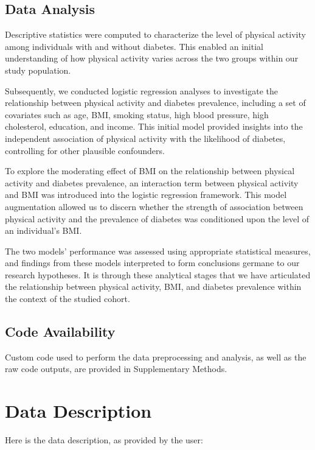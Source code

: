 \documentclass[11pt]{article}
\begin{document}
\subsection*{Data Analysis}
Descriptive statistics were computed to characterize the level of physical activity among individuals with and without diabetes. This enabled an initial understanding of how physical activity varies across the two groups within our study population.

Subsequently, we conducted logistic regression analyses to investigate the relationship between physical activity and diabetes prevalence, including a set of covariates such as age, BMI, smoking status, high blood pressure, high cholesterol, education, and income. This initial model provided insights into the independent association of physical activity with the likelihood of diabetes, controlling for other plausible confounders.

To explore the moderating effect of BMI on the relationship between physical activity and diabetes prevalence, an interaction term between physical activity and BMI was introduced into the logistic regression framework. This model augmentation allowed us to discern whether the strength of association between physical activity and the prevalence of diabetes was conditioned upon the level of an individual's BMI.

The two models' performance was assessed using appropriate statistical measures, and findings from these models interpreted to form conclusions germane to our research hypotheses. It is through these analytical stages that we have articulated the relationship between physical activity, BMI, and diabetes prevalence within the context of the studied cohort.\subsection*{Code Availability}

Custom code used to perform the data preprocessing and analysis, as well as the raw code outputs, are provided in Supplementary Methods.






\clearpage
\appendix

\section{Data Description} \label{sec:data_description} Here is the data description, as provided by the user:
\end{document}
